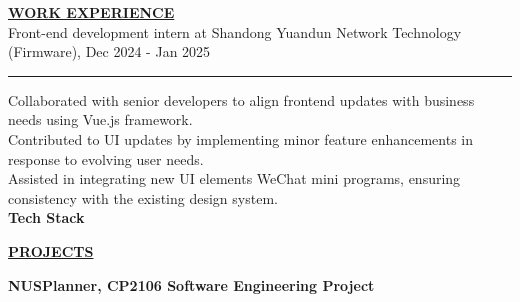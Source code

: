 \documentclass{article}
\begin{document}
\noindent \textbf{\underline{WORK EXPERIENCE}} \\ %
\indent\hfill{Front-end development intern at Shandong Yuandun Network Technology (Firmware), \indent \indent {     \indent    } Dec 2024 - Jan 2025} \\
\vspace{-0.7cm} %

\indent\rule{\linewidth}{0.4pt} %
\indent \textbullet{} Collaborated with senior developers to align frontend updates with business needs using Vue.js framework.\\
\indent \textbullet{} Contributed to UI updates by implementing minor feature enhancements in response to evolving user needs.\\
\indent \textbullet{} Assisted in integrating new UI elements WeChat mini programs, ensuring consistency with the existing design system. \\
\indent\textbullet{} \textbf{Tech Stack} \\
\indent\indent {}
\vspace{0.2cm}

\noindent \textbf{\underline{PROJECTS}} \\
\vspace{-0.4cm}

\indent \textbf{NUSPlanner, CP2106 Software Engineering Project} \\
\vspace{-0.7cm} %
\end{document}
